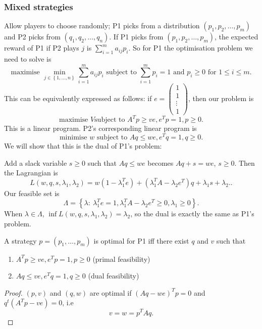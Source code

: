 \documentclass[a4paper]{scrartcl}
\begin{document}
\subsubsection{Mixed strategies}
Allow players to choose randomly; P1 picks from a distribution $(p_1,p_2,\ldots ,p_m)$ and P2 picks from $(q_1,q_2,\ldots ,q_n)$. If P1 picks from $(p_1,p_2,\ldots ,p_m)$, the expected reward of P1 if P2 plays $j$ is $\sum_{i=1}^{m}a_{ij}p_i$. So for P1 the optimisation problem we need to solve is 
\[\text{maximise } \min_{j \in \left\{1,\ldots ,n\right\}}\sum_{i=1}^{m}a_{ij}p_i \text{ subject to } \sum_{i=1}^{m}p_i=1 \text{ and } p_i \geq 0 \text{ for } 1 \leq i \leq m.\]
This can be equivalently expressed as follows: if $e=\begin{pmatrix} 1\\1\\\vdots\\1 \end{pmatrix}$, then our problem is  \[
\text{maximise } V \text{subject to } A^{T}p \geq ve, e^{T}p=1,p \geq 0 
.\] 
This is a linear program. P2's corresponding linear program is \[
\text{minimise } w \text{ subject to } Aq \leq we, e^{T}q=1, q \geq 0
.\]
We will show that this is the dual of P1's problem:

Add a slack variable $s \geq 0$ such that $Aq \leq we$ becomes $Aq+s=we$, $s \geq 0$. Then the Lagrangian is \[
L (w,q,s, \lambda_1 , \lambda_2 )=w (1-\lambda_1^{T}e)+(\lambda_1^{T}A-\lambda_2 e^{T})q+\lambda_1 s+\lambda_2. 
.\]
Our feasible set is \[
	\Lambda=\left\{\lambda: \ \lambda_1^{T}e=1, \lambda_1^{T}A-\lambda_2 e^{T}\geq 0, \lambda_1 \geq 0\right\}
.\]
When $\lambda \in \Lambda$, $\inf L (w,q,s,\lambda_1,\lambda_2)=\lambda_2$, so the dual is exactly the same as P1's problem.
\begin{theorem}
	 A strategy $p=(p_1 ,\ldots ,p_m)$ is optimal for P1 iff there exist  $q$ and $v$ such that 
	 \begin{enumerate}
		 \item $A^{T}p \geq ve, e^{T}p=1, p\geq 0$ (primal feasibility)
		 \item $Aq \leq ve, e^{T}q=1, q\geq 0$ (dual feasibility)
	 \end{enumerate} 
\end{theorem} 
\begin{proof}
	 $(p,v)$ and $(q,w)$ are optimal if $(Aq-we)^Tp=0$ and $q^t (A^{T}p-ve)=0$, i.e \[
	 v=w=p^{T}Aq
	 .\] 
\end{proof}
\end{document}
